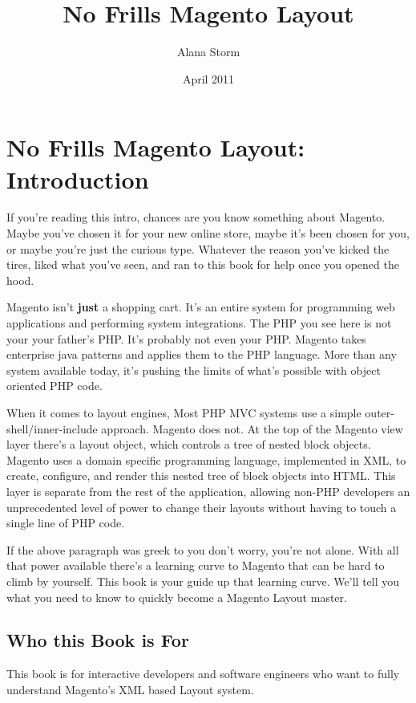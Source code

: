 \documentclass[oneside]{book}
\begin{document}
\title{No Frills Magento Layout}
\author{Alana Storm}
\date{April 2011}

\maketitle
\tableofcontents
\setcounter{chapter}{-1}

\chapter{No Frills Magento Layout: Introduction}
If you're reading this intro, chances are you know something about Magento.  Maybe you've chosen it for your new online store, maybe it's been chosen for you, or maybe you're just the curious type.  Whatever the reason you've kicked the tires, liked what you've seen, and ran to this book for help once you opened the hood.

Magento isn't \textbf{just} a shopping cart.  It's an entire system for programming web applications and performing system integrations.  The PHP you see here is not your your father's PHP.  It's probably not even your PHP.  Magento takes enterprise java patterns and applies them to the PHP language.  More than any system available today, it's pushing the limits of what's possible with object oriented PHP code.

When it comes to layout engines, Most PHP MVC systems use a simple outer-shell/inner-include approach.  Magento does not.  At the top of the Magento view layer there's a layout object, which controls a tree of nested block objects. Magento uses a domain specific programming language, implemented in XML, to create, configure, and render this nested tree of block objects into HTML.  This layer is separate from the rest of the application, allowing non-PHP developers an unprecedented level of power to change their layouts without having to touch a single line of PHP code.

If the above paragraph was greek to you don't worry, you're not alone.  With all that power available there's a learning curve to Magento that can be hard to climb by yourself.   This book is your guide up that learning curve.  We'll tell you what you need to know to quickly become a Magento Layout master.

\section{Who this Book is For}

This book is for interactive developers and software engineers who want to fully understand Magento's XML based Layout system.
\end{document}
